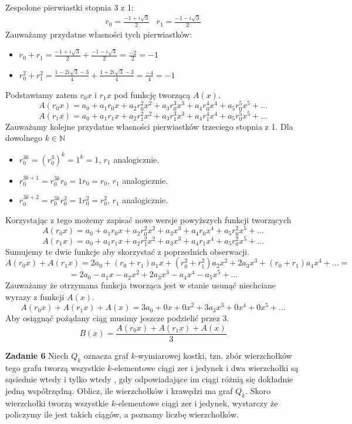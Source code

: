\documentclass[12pt,a4paper]{article}
\begin{document}
Zespolone pierwiastki stopnia 3 z 1:
\[
	\begin{array}{ll}
		r_0 = \frac{-1 + i\sqrt{3}}{2}	&  r_1 = \frac{-1 - i\sqrt{3}}{2}
	\end{array}
\]
Zauważamy przydatne własności tych pierwiastków:
\begin{itemize}
	\item \( r_0 + r_1 = \frac{-1 + i\sqrt{3}}{2} + \frac{-1 - i\sqrt{3}}{2} = \frac{-2}{2} = -1\)
	\item \( r_0^2 + r_1^2 = \frac{1 - 2i\sqrt{3} - 3}{4} + \frac{1 + 2i\sqrt{3} - 3}{4} = \frac{-4}{4} = -1\)
\end{itemize}
Podstawiamy zatem \(r_0x\) i \(r_1x\) pod funkcję tworzącą \(A(x)\).
\[
	A(r_0x) = a_0 + a_1r_0x + a_2r_0^2x^2 + a_3r_0^3x^3 + a_4r_0^4x^4 + a_5r_0^5x^5 + ...
\]
\[
	A(r_1x) = a_0 + a_1r_1x + a_2r_1^2x^2 + a_3r_1^3x^3 + a_4r_1^4x^4 + a_5r_0^5x^5 + ...
\]
Zauważamy kolejne przydatne własności pierwiastków trzeciego stopnia z 1. Dla dowolnego \(k\in \mathbb{N} \)
\begin{itemize}
	\item \( r_0^{3k} = (r_0^3)^k = 1^k = 1 \), \(r_1\) analogicznie.
	\item \( r_0^{3k+1} = r_0^{3k}r_0 = 1r_0 = r_0  \), \(r_1\) analogicznie.
	\item \( r_0^{3k+2} = r_0^{3k}r_0^2 = 1r_0^2 = r_0^2  \), \(r_1\) analogicznie.
\end{itemize}
Korzystając z tego możemy zapisać nowe wersje powyższych funkcji tworzących
\[
	A(r_0x) = a_0 + a_1r_0x + a_2r_0^2x^2 + a_3x^3 + a_4r_0x^4 + a_5r_0^2x^5 + ...
\]
\[
	A(r_1x) = a_0 + a_1r_1x + a_2r_1^2x^2 + a_3x^3 + a_4r_1x^4 + a_5r_0^2x^5 + ...
\]
Sumujemy te dwie funkcje aby skorzystać z poprzednich obserwacji.
\[
	A(r_0x) + A(r_1x) = 2a_0 + (r_0+r_1)a_1x + (r_0^2+r_1^2)a_2x^2 + 2a_3x^3 + (r_0+r_1)a_4x^4 + ... =
\]
\[
	= 2a_0 - a_1x - a_2x^2 + 2a_3x^3 - a_4x^4 - a_5x^5 + ... 
\]
Zauważamy że otrzymana funkcja tworząca jest w stanie usunąć niechciane wyrazy z funkcji \(A(x)\).
\[
	A(r_0x) + A(r_1x) + A(x) = 3a_0 + 0x + 0x^2 + 3a_3x^3 + 0x^4 + 0x^5 + ...
\]
Aby osiągnąć pożądany ciąg musimy jeszcze podzielić przez 3.
\[
	B(x) = \frac{A(r_0x) + A(r_1x) + A(x)}{3}
\]

\vskip 0.5cm
\noindent
\textbf{Zadanie 6} Niech \( Q_k \) oznacza graf \( k \)-wymiarowej kostki, tzn. zbór wierzchołków tego 
grafu tworzą wszystkie \(k\)-elementowe ciągi zer i jedynek i dwa wierzchołki są sąsiednie wtedy i tylko wtedy , gdy odpowiadające im ciągi różnią się dokładnie jedną współrzędną. Oblicz, ile wierzchołków i krawędzi ma graf \(Q_k\).
\vskip 0.5cm
Skoro wierzchołki tworzą wszystkie \(k\)-elementowe ciągi zer i jedynek, wystarczy że policzymy ile jest takich ciągów, a poznamy liczbę wierzchołków.
\end{document}

